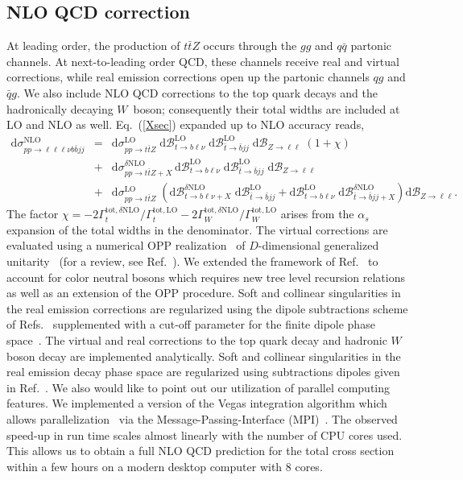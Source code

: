 \documentclass{JHEP3}
\newcommand{\mrm}{\mathrm}
\newcommand{\rd}{\mathrm{d}}
\newcommand{\Br}{\mathcal{B}}
\def\ttbZ{t\bar{t}Z}
\newcommand{\be}{\begin{eqnarray}}
\newcommand{\ee}{\end{eqnarray}}
\begin{document}
\subsection{NLO QCD correction}
At leading order, the production of $\ttbZ$ occurs through the $gg$ and $q\bar{q}$ partonic channels. 
At next-to-leading order QCD, these channels receive real and virtual corrections, while real emission corrections open up the partonic channels $qg$ and $\bar{q}g$. 
We also include NLO QCD corrections to the top quark decays and the hadronically decaying $W$~boson; consequently their total widths are included at LO and NLO as well.
Eq.~(\ref{Xsec}) expanded up to NLO accuracy reads,
\be
  \rd \sigma_{pp\to\ell\ell\ell\nu b \bar{b} jj}^\mrm{NLO} &=& 
  \rd \sigma_{pp\to\ttbZ}^\mrm{LO} \; \rd\Br_{t\to b \ell\nu}^\mrm{LO} \; \rd\Br_{\bar{t} \to \bar{b} jj}^\mrm{LO} \; \rd\Br_{Z\to \ell\ell}
  \; \left( 1 + \chi \right)
  \nonumber \\
  &+&   \rd \sigma_{pp\to\ttbZ+X}^{\delta \mrm{NLO}}  \, \rd\Br_{t\to b \ell\nu}^\mrm{LO} \; \rd\Br_{\bar{t} \to \bar{b} jj}^\mrm{LO} \; \rd\Br_{Z\to \ell\ell}
  \\
  &+&  \rd \sigma_{pp\to\ttbZ}^\mrm{LO} \; \left(  \rd\Br_{t\to b \ell\nu+X}^{\delta\mrm{NLO}} \; \rd\Br_{\bar{t} \to \bar{b} jj}^\mrm{LO} + \rd\Br_{t\to b \ell\nu}^\mrm{LO} \; 
  \rd\Br_{\bar{t} \to \bar{b} jj+X}^{\delta\mrm{NLO}} \right) \rd\Br_{Z\to \ell\ell}
  \nonumber. \label{XsecNLO}
\ee
The factor $\chi= -2 \Gamma_t^{\mrm{tot},\delta\mrm{NLO}}/\Gamma_t^{\mrm{tot,LO}} -2 \Gamma_W^{\mrm{tot},\delta\mrm{NLO}}/\Gamma_W^{\mrm{tot,LO}} $ arises from the $\alpha_s$ expansion
of the total widths in the denominator.
The virtual corrections are evaluated using a numerical OPP realization~\cite{Ossola:2006} of $D$-dimensional generalized unitarity~\cite{Ellis:2007br,Giele:2008ve,Ellis:2008ir} (for a review, see Ref.~\cite{Ellis:2011}).
We extended the framework of Ref.~\cite{Melnikov:2009dn} to account for color neutral bosons 
which requires new tree level recursion relations as well as an extension of the OPP procedure.
Soft and collinear singularities in the real emission corrections are regularized using the dipole subtractions scheme of Refs.~\cite{Catani:1996vz,Catani:2002hc} supplemented with a cut-off parameter for the
finite dipole phase space~\cite{Nagy:1998bb,Nagy:2003tz,Bevilacqua:2009zn,Campbell:2010ff}.
The virtual and real corrections to the top quark decay and hadronic $W$ boson decay are implemented analytically. 
Soft and collinear singularities in the real emission decay phase space are regularized using subtractions dipoles given in Ref.~\cite{Melnikov:2011ta}.
We also would like to point out our utilization of parallel computing features. 
We implemented a version of the Vegas integration algorithm which allows parallelization~\cite{pvegas} via the Message-Passing-Interface (MPI)~\cite{mpi-2-standard}. 
The observed speed-up in run time scales almost linearly with the number of CPU cores used. 
This allows us to obtain a full NLO QCD prediction for the total cross section within a few hours on a modern desktop computer with 8 cores.
\end{document}
